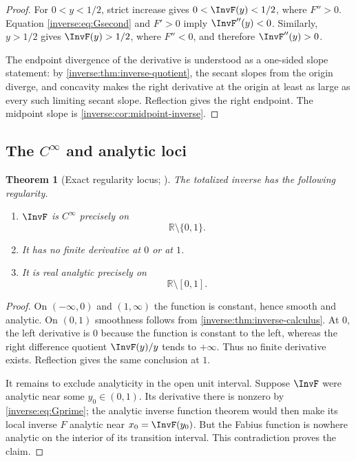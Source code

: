 \documentclass[11pt,oneside]{article}
\newtheorem{theorem}{Theorem}[section]
\theoremstyle{definition}
\theoremstyle{remark}
\newcommand{\R}{\mathbb R}
\begin{document}
\begin{proof}
For $0<y<1/2$, strict increase gives $0<\InvF(y)<1/2$, where
$F''>0$.  Equation \eqref{inverse:eq:Gsecond} and $F'>0$ imply
$\InvF''(y)<0$.  Similarly, $y>1/2$ gives $\InvF(y)>1/2$, where
$F''<0$, and therefore $\InvF''(y)>0$.

The endpoint divergence of the derivative is understood as a one-sided
slope statement: by \cref{inverse:thm:inverse-quotient}, the secant slopes from
the origin diverge, and concavity makes the right derivative at the
origin at least as large as every such limiting secant slope.  Reflection
gives the right endpoint.  The midpoint slope is
\cref{inverse:cor:midpoint-inverse}.
\end{proof}

\subsection{\texorpdfstring{The \(C^\infty\) and analytic loci}{The smooth and analytic loci}}

\begin{theorem}[Exact regularity locus; \Derived]
\label{inverse:thm:inverse-regularity}
The totalized inverse has the following regularity.
\begin{enumerate}
\item $\InvF$ is $C^\infty$ precisely on
\[
 \R\setminus\{0,1\}.
\]
\item It has no finite derivative at $0$ or at $1$.
\item It is real analytic precisely on
\[
 \R\setminus[0,1].
\]
\end{enumerate}
\end{theorem}

\begin{proof}
On $(-\infty,0)$ and $(1,\infty)$ the function is constant, hence smooth
and analytic.  On $(0,1)$ smoothness follows from
\cref{inverse:thm:inverse-calculus}.  At $0$, the left derivative is $0$ because
the function is constant to the left, whereas the right difference
quotient $\InvF(y)/y$ tends to $+\infty$.  Thus no finite derivative
exists.  Reflection gives the same conclusion at $1$.

It remains to exclude analyticity in the open unit interval.  Suppose
$\InvF$ were analytic near some $y_0\in(0,1)$.  Its derivative there is
nonzero by \eqref{inverse:eq:Gprime}; the analytic inverse function theorem would
then make its local inverse $F$ analytic near $x_0=\InvF(y_0)$.  But the
Fabius function is nowhere analytic on the interior of its transition
interval.  This contradiction proves the claim.
\end{proof}
\end{document}
